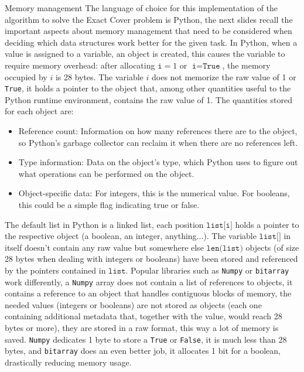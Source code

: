 \documentclass{beamer}
\begin{document}

\begin{frame}{Memory management}
    \small
    The language of choice for this implementation of the algorithm
    to solve the Exact Cover problem is Python, the next slides recall
    the important aspects about memory management that need to be 
    considered when deciding which data structures work better for the
    given task.
    In Python, when a value is assigned to a variable, an object is created, this
    causes the variable to require memory overhead: after
    allocating $\texttt{i} = 1$ or $\texttt{i} = \texttt{True}$, the memory occupied by
    $i$ is 28 bytes.
    The variable $i$ does not memorize the raw value of 1 or \texttt{True}, it holds
    a pointer to the object that, among other quantities useful to the Python
    runtime environment, contains the raw value of 1. The quantities
    stored for each object are:
    \begin{itemize}
        \item Reference count: Information on how many references there 
        are to the object, so Python's garbage collector can reclaim it 
        when there are no references left. 
        \item Type information: Data on the object's type, which Python 
        uses to figure out what operations can be performed on the object.
        \item Object-specific data: For integers, this is the numerical value. 
        For booleans, this could be a simple flag indicating true or false.
    \end{itemize}
\end{frame}

\begin{frame}{}
    The default list in Python is a linked list, each position $\texttt{list[i]}$ holds a pointer to the
    respective object
    (a boolean, an integer, anything...).
    The variable $\texttt{list[]}$ in itself doesn't contain any raw value but somewhere else
    $\texttt{len(list)}$ objects (of size 28 bytes when dealing with integers or booleans)
    have been stored and referenced by the pointers contained in $\texttt{list}$.
    Popular libraries such as \texttt{Numpy} or \texttt{bitarray} work differently,
    a \texttt{Numpy} array does not contain a list of references to objects, it contains
    a reference to an object that handles contiguous blocks of memory, the needed
    values (integers or booleans) are not stored as objects (each one containing additional metadata
    that, together with the value, would reach 28 bytes or more), they are stored in a raw format,
    this way a lot of memory is saved.
    \texttt{Numpy} dedicates 1 byte to store a \texttt{True} or \texttt{False}, it is much less
    than 28 bytes, and \texttt{bitarray} does an even better job, it allocates 1 bit for a boolean,
    drastically reducing memory usage.
\end{frame}
\end{document}
